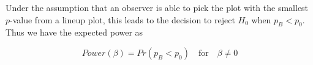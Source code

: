 \documentclass{article}
\newcommand{\red}[1]{{\color{red} #1}}
\begin{document}

Under the assumption that an observer is able to pick the plot with the smallest $p$-value from a lineup plot,  this leads to the decision to reject $H_0$ when $p_{B} < p_0$. Thus we have the expected power as 

\begin{equation}\label{power_exp} 
   Power(\beta)=Pr(p_{B} < p_0)  \quad \text{for}  \quad \beta \ne 0
\end{equation}
\end{document}
